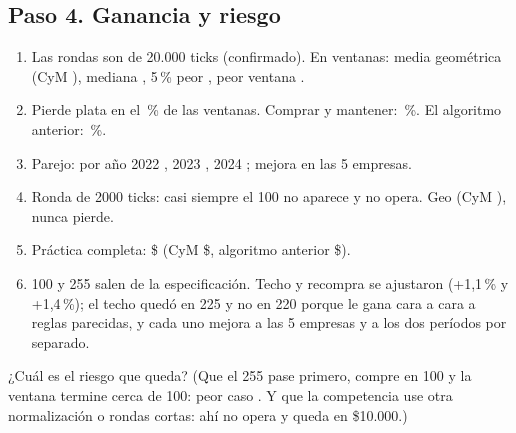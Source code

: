 \documentclass[11pt,letterpaper]{article}
\begin{document}
\subsection*{Paso 4. Ganancia y riesgo}
\begin{enumerate}
\item Las rondas son de 20.000 ticks (confirmado). En \NVentanas{} ventanas: media geométrica \ExtGeo{} (CyM \CymGeo), mediana
  \ExtMediana, 5\,\% peor \ExtPcinco, peor ventana \ExtPeor.
\item Pierde plata en el \ExtPierde\,\% de las ventanas. Comprar y mantener: \CymPierde\,\%. El algoritmo
  anterior: \TendPierde\,\%.
\item Parejo: por año 2022 \ExtGeoDosmilveintidos, 2023 \ExtGeoDosmilveintitres, 2024
  \ExtGeoDosmilveinticuatro; mejora en las 5 empresas.
\item Ronda de 2000 ticks: casi siempre el 100 no aparece y no opera. Geo \ExtCortaGeo{} (CyM
  \CymCortaGeo), nunca pierde.
\item Práctica completa: \$\MetaW{} (CyM \$\MetaCym, algoritmo anterior \$\MetaWTend).
\item 100 y 255 salen de la especificación. Techo y recompra se ajustaron (+1,1\,\% y +1,4\,\%); el techo
  quedó en 225 y no en 220 porque le gana cara a cara a reglas parecidas, y cada uno
  mejora a las 5 empresas y a los dos períodos por separado.
\end{enumerate}
\begin{checkpoint}
¿Cuál es el riesgo que queda? (Que el 255 pase primero, compre en 100 y la ventana termine cerca de 100:
peor caso \ExtPeor. Y que la competencia use otra normalización o rondas cortas: ahí no opera y queda en
\$10.000.)
\end{checkpoint}
\end{document}
